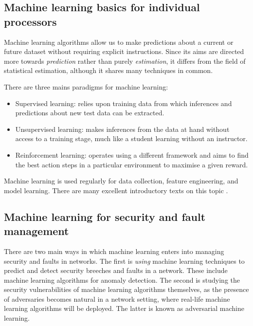 \documentclass[twocolumn, aps, rmp, amsmath, amssymb, nofootinbib, superscriptaddress, longbibliography, floatfix, table-of-contents, eqsecnum]{revtex4}
\begin{document}
\subsection{Machine learning basics for individual processors}

Machine learning algorithms allow us to make predictions about a current or future dataset without requiring explicit instructions. Since its aims are directed more towards \textit{prediction} rather than purely \textit{estimation}, it differs from the field of statistical estimation, although it shares many techniques in common.

There are three mains paradigms for machine learning:
\begin{itemize}
	\item Supervised learning: relies upon training data from which inferences and predictions about new test data can be extracted.
	\item Unsupervised learning: makes inferences from the data at hand without access to a training stage, much like a student learning without an instructor.
	\item Reinforcement learning:	operates using a different framework and aims to find the best action steps in a particular environment to maximise a given reward.
\end{itemize}

Machine learning is used regularly for data collection, feature engineering, and model learning. There are many excellent introductory texts on this topic \cite{bib:bishop2006pattern, bib:shalev2014understanding, bib:trevor2009elements, bib:marsland2011machine, bib:flach2012machine}.


\subsection{Machine learning for security and fault management}

There are two main ways in which machine learning enters into managing security and faults in networks. The first is \textit{using} machine learning techniques to predict and detect security breeches and faults in a network. These include machine learning algorithms for anomaly detection. The second is studying the security vulnerabilities of machine learning algorithms themselves, as the presence of adversaries becomes natural in a network setting, where real-life machine learning algorithms will be deployed. The latter is known as adversarial machine learning.
\end{document}
